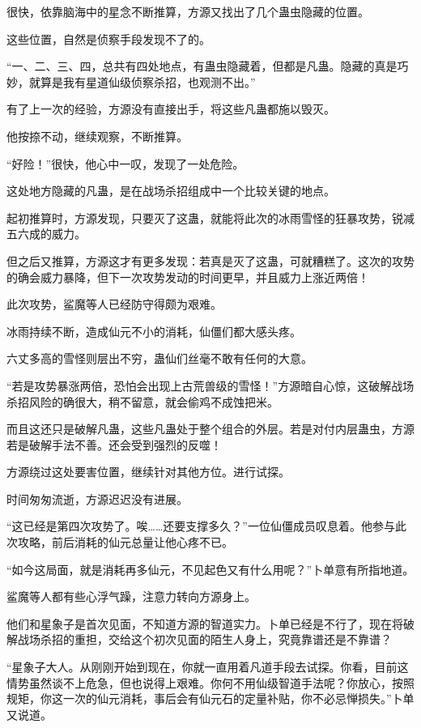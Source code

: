 
\begin{this_body}

很快，依靠脑海中的星念不断推算，方源又找出了几个蛊虫隐藏的位置。

这些位置，自然是侦察手段发现不了的。

“一、二、三、四，总共有四处地点，有蛊虫隐藏着，但都是凡蛊。隐藏的真是巧妙，就算是我有星道仙级侦察杀招，也观测不出。”

有了上一次的经验，方源没有直接出手，将这些凡蛊都施以毁灭。

他按捺不动，继续观察，不断推算。

“好险！”很快，他心中一叹，发现了一处危险。

这处地方隐藏的凡蛊，是在战场杀招组成中一个比较关键的地点。

起初推算时，方源发现，只要灭了这蛊，就能将此次的冰雨雪怪的狂暴攻势，锐减五六成的威力。

但之后又推算，方源这才有更多发现：若真是灭了这蛊，可就糟糕了。这次的攻势的确会威力暴降，但下一次攻势发动的时间更早，并且威力上涨近两倍！

此次攻势，鲨魔等人已经防守得颇为艰难。

冰雨持续不断，造成仙元不小的消耗，仙僵们都大感头疼。

六丈多高的雪怪则层出不穷，蛊仙们丝毫不敢有任何的大意。

“若是攻势暴涨两倍，恐怕会出现上古荒兽级的雪怪！”方源暗自心惊，这破解战场杀招风险的确很大，稍不留意，就会偷鸡不成蚀把米。

而且这还只是破解凡蛊，这些凡蛊处于整个组合的外层。若是对付内层蛊虫，方源若是破解手法不善。还会受到强烈的反噬！

方源绕过这处要害位置，继续针对其他方位。进行试探。

时间匆匆流逝，方源迟迟没有进展。

“这已经是第四次攻势了。唉……还要支撑多久？”一位仙僵成员叹息着。他参与此次攻略，前后消耗的仙元总量让他心疼不已。

“如今这局面，就是消耗再多仙元，不见起色又有什么用呢？”卜单意有所指地道。

鲨魔等人都有些心浮气躁，注意力转向方源身上。

他们和星象子是首次见面，不知道方源的智道实力。卜单已经是不行了，现在将破解战场杀招的重担，交给这个初次见面的陌生人身上，究竟靠谱还是不靠谱？

“星象子大人。从刚刚开始到现在，你就一直用着凡道手段去试探。你看，目前这情势虽然谈不上危急，但也说得上艰难。你何不用仙级智道手法呢？你放心，按照规矩，你这一次的仙元消耗，事后会有仙元石的定量补贴，你不必忌惮损失。”卜单又说道。


\end{this_body}
